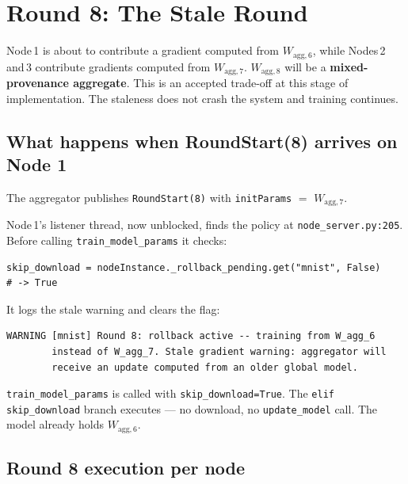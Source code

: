 \documentclass[11pt,a4paper]{article}
\newcommand{\Wagg}[1]{$W_{\text{agg},#1}$}
\begin{document}
\newpage
\section{Round 8: The Stale Round}
\label{sec:round8}

\begin{tcolorbox}[stalebox={Stale gradient warning}]
  Node\,1 is about to contribute a gradient computed from \Wagg{6},
  while Nodes\,2 and\,3 contribute gradients computed from \Wagg{7}.
  \Wagg{8} will be a \textbf{mixed-provenance aggregate}.
  This is an accepted trade-off at this stage of implementation.
  The staleness does not crash the system and training continues.
\end{tcolorbox}

\subsection{What happens when RoundStart(8) arrives on Node 1}

The aggregator publishes \texttt{RoundStart(8)} with
\texttt{initParams} $=$ \Wagg{7}.

Node\,1's listener thread, now unblocked, finds the policy at
\texttt{node\_server.py:205}.  Before calling
\texttt{train\_model\_params} it checks:

\begin{lstlisting}[style=bash]
skip_download = nodeInstance._rollback_pending.get("mnist", False)
# -> True
\end{lstlisting}

It logs the stale warning and clears the flag:

\begin{lstlisting}[style=log]
WARNING [mnist] Round 8: rollback active -- training from W_agg_6
        instead of W_agg_7. Stale gradient warning: aggregator will
        receive an update computed from an older global model.
\end{lstlisting}

\texttt{train\_model\_params} is called with \texttt{skip\_download=True}.
The \texttt{elif skip\_download} branch executes --- no download, no
\texttt{update\_model} call.  The model already holds \Wagg{6}.

\subsection{Round 8 execution per node}
\end{document}

